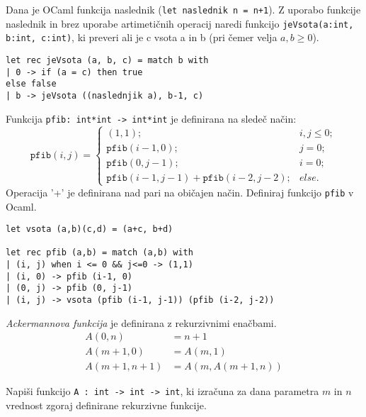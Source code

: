 \begin{ex}
Dana je OCaml funkcija naslednik (\lstinline{let naslednik n = n+1}). Z uporabo funkcije naslednik in brez uporabe artimeti\v cnih operacij naredi funkcijo \lstinline{jeVsota(a:int, b:int, c:int)}, ki preveri ali je c vsota a in b (pri \v cemer velja $a,b\geq 0$).


\begin{sol}
\begin{lstlisting}
let rec jeVsota (a, b, c) = match b with
| 0 -> if (a = c) then true
else false
| b -> jeVsota ((naslednjik a), b-1, c)
\end{lstlisting}
\end{sol}



\end{ex}
\begin{ex}
Funkcija \lstinline{pfib: int*int -> int*int} je definirana na slede\v c na\v cin:
$$
\mathtt{pfib}(i,j)=\begin{cases}
(1,1); & i,j\le0;\\
\mathtt{pfib}(i-1,0); & j=0;\\
\mathtt{pfib}(0,j-1); & i=0;\\
\mathtt{pfib}(i-1,j-1)+\mathtt{pfib}(i-2,j-2); & else.
\end{cases}
$$
Operacija '+' je definirana nad pari na obi\v cajen na\v cin. Definiraj funkcijo \lstinline{pfib} v Ocaml.

\begin{sol}
\begin{lstlisting}
let vsota (a,b)(c,d) = (a+c, b+d)

let rec pfib (a,b) = match (a,b) with
| (i, j) when i <= 0 && j<=0 -> (1,1)
| (i, 0) -> pfib (i-1, 0)
| (0, j) -> pfib (0, j-1)
| (i, j) -> vsota (pfib (i-1, j-1)) (pfib (i-2, j-2))    
\end{lstlisting}
\end{sol}



\end{ex}
\begin{ex}
\emph{Ackermannova funkcija} je definirana z rekurzivnimi ena\v cbami.
\begin{align*}
A(0, n) &= n+1 \\
A(m + 1, 0) &= A(m, 1) \\ 
A(m + 1, n + 1) &= A(m, A(m + 1, n)) 
\end{align*}

Napi\v si funkcijo \lstinline{A : int -> int -> int}, ki izra\v cuna za dana parametra $m$ in $n$ vrednost zgoraj definirane rekurzivne funkcije.
\end{ex}




